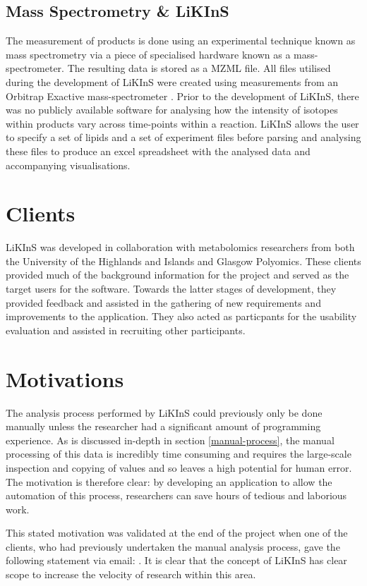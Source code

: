 \documentclass{l4proj}
\begin{document}
\subsection{Mass Spectrometry \& LiKInS}
The measurement of products is done using an experimental technique known as mass spectrometry via a piece of specialised hardware known as a mass-spectrometer. The resulting data is stored as a MZML file. All files utilised during the development of LiKInS were created using measurements from an Orbitrap Exactive mass-spectrometer \citep{thermofisher}. Prior to the development of LiKInS, there was no publicly available software for analysing how the intensity of isotopes within products vary across time-points within a reaction. LiKInS allows the user to specify a set of lipids and a set of experiment files before parsing and analysing these files to produce an excel spreadsheet with the analysed data and accompanying visualisations.



\section{Clients}\label{clients}
LiKInS was developed in collaboration with metabolomics researchers from both the University of the Highlands and Islands and Glasgow Polyomics. These clients provided much of the background information for the project and served as the target users for the software. Towards the latter stages of development, they provided feedback and assisted in the gathering of new requirements and improvements to the application. They also acted as particpants for the usability evaluation and assisted in recruiting other participants. 

\section{Motivations}
The analysis process performed by LiKInS could previously only be done manually unless the researcher had a significant amount of programming experience. As is discussed in-depth in section \ref{manual-process}, the manual processing of this data is incredibly time consuming and requires the large-scale inspection and copying of values and so leaves a high potential for human error. The motivation is therefore clear: by developing an application to allow the automation of this process, researchers can save hours of tedious and laborious work. 

This stated motivation was validated at the end of the project when one of the clients, who had previously undertaken the manual analysis process, gave the following statement via email: . It is clear that the concept of LiKInS has clear scope to increase the velocity of research within this area.
\end{document}
